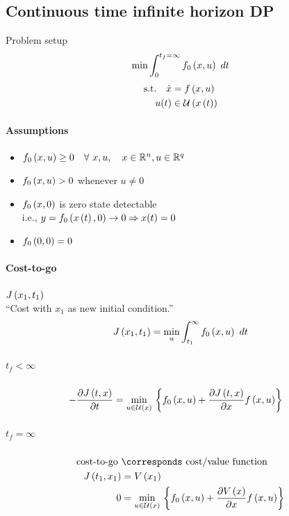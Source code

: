 \subsection{Continuous time infinite horizon DP}

\begin{optExample}{Problem setup}
\begin{align*}
    \min \int_{0}^{t_f = \infty}  f_0 \left( x,u \right)  ~dt
\end{align*}
\begin{align*}
    \txt{s.t.} \quad \dot{x} &= f\paren{x,u}\\
    u(t) &\in \setU{x\paren{t}}
\end{align*}
\end{optExample}

\paragraph{Assumptions}
\begin{itemize}
    \item $f_0 \left( x,u \right) \geq 0 \quad \forall ~ x,u, \quad x \in \mathbb{R}^n, u \in \mathbb{R}^q$
    \item $f_0 \left( x,u \right) > 0$ whenever $u\neq 0$
    \item $f_0 \left( x,0 \right)$ is zero state detectable\\
        i.e., $y = f_0 \left( x\left( t \right),0 \right) \rightarrow 0 \Rightarrow x(t) = 0$
    \item $f_0 \left( 0,0 \right) = 0$
\end{itemize}

\paragraph{Cost-to-go} $J \left( x_1,t_1 \right)$\\
``Cost with $x_1$ as new initial condition.''
\begin{align*}
J \left( x_1,t_1 \right) = \min_{u} \int_{t_1}^{\infty} f_0 \left( x,u \right) ~dt
\end{align*}

\subparagraph{$t_f < \infty$}
\begin{align*}
    -\pdein{J \paren{t,x}}{t} &= \minux{} \set{f_0 \paren{x,u} + \pdein{J \paren{t,x}}{x}f \paren{x,u} }
\end{align*}

\subparagraph{$t_f = \infty$}
\begin{align*}
\txt{cost-to-go } &\corresponds \txt{ cost/value function}\\
J \paren{t_1,x_1} &= V \paren{x_1}\\
    0 &= \minux{} \set{f_0 \paren{x,u} + \pdein{V \paren{x}}{x}f \paren{x,u} }
\end{align*}


